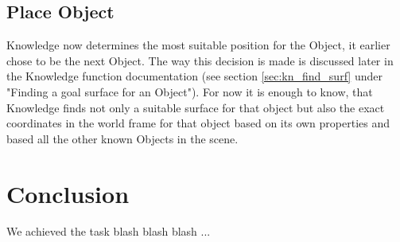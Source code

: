 \documentclass[main.tex]{subfiles}
\begin{document}
	
	
	
	\subsection{Place Object}
	
	
	
	
Knowledge now determines the most suitable position for the Object, it earlier chose to be the next Object. The way this decision is made is discussed later in the Knowledge function documentation (see section \ref{sec:kn_find_surf} under "Finding a goal surface for an Object"). For now it is enough to know, that Knowledge finds not only a suitable surface for that object but also the exact coordinates in the world frame for that object based on its own properties and based all the other known Objects in the scene.
	
	
	
	
	
	
	
	
	
	
	\section{Conclusion}

	We achieved the task blash blash blash ...
	
	
	\endgroup
	
\end{document}
